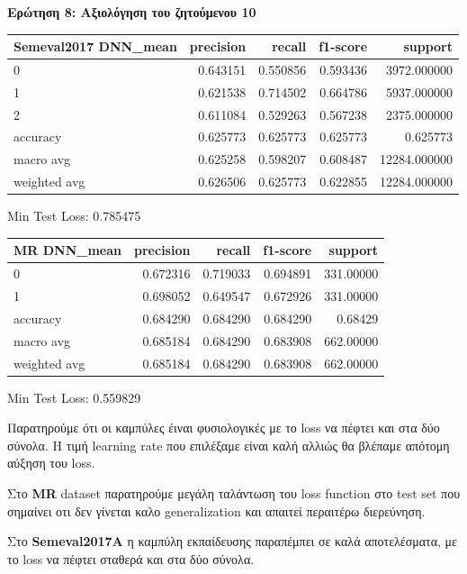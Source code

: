 \documentclass[12pt]{article}
\begin{document}
\textbf{Ερώτηση 8: Αξιολόγηση του ζητούμενου 10}


\begin{tabular}{lrrrr}
\toprule
Semeval2017 DNN\_mean &  precision &    recall &  f1-score &       support \\
\midrule
0            &   0.643151 &  0.550856 &  0.593436 &   3972.000000 \\
1            &   0.621538 &  0.714502 &  0.664786 &   5937.000000 \\
2            &   0.611084 &  0.529263 &  0.567238 &   2375.000000 \\
accuracy     &   0.625773 &  0.625773 &  0.625773 &      0.625773 \\
macro avg    &   0.625258 &  0.598207 &  0.608487 &  12284.000000 \\
weighted avg &   0.626506 &  0.625773 &  0.622855 &  12284.000000 \\
\bottomrule
\end{tabular}

Min Test Loss: 0.785475
\\

\begin{tabular}{lrrrr}
\toprule
MR DNN\_mean &  precision &    recall &  f1-score &    support \\
\midrule
0            &   0.672316 &  0.719033 &  0.694891 &  331.00000 \\
1            &   0.698052 &  0.649547 &  0.672926 &  331.00000 \\
accuracy     &   0.684290 &  0.684290 &  0.684290 &    0.68429 \\
macro avg    &   0.685184 &  0.684290 &  0.683908 &  662.00000 \\
weighted avg &   0.685184 &  0.684290 &  0.683908 &  662.00000 \\
\bottomrule
\end{tabular}

Min Test Loss: 0.559829



Παρατηρούμε ότι οι καμπύλες έιναι φυσιολογικές με το loss να πέφτει και στα δύο σύνολα. Η τιμή learning rate που επιλέξαμε είναι καλή αλλιώς θα βλέπαμε απότομη αύξηση του loss. 

Στο \textbf{MR} dataset παρατηρούμε μεγάλη ταλάντωση του loss function στο test set που σημαίνει οτι δεν γίνεται καλο generalization και απαιτεί περαιτέρω διερεύνηση.  

Στο \textbf{Semeval2017A} η καμπύλη εκπαίδευσης παραπέμπει σε καλά αποτελέσματα, με το loss να πέφτει σταθερά και στα δύο σύνολα. 
\end{document}
